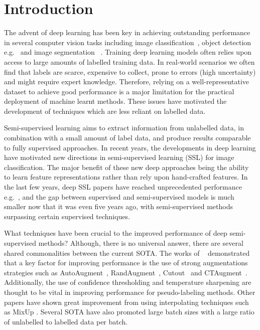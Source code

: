 \documentclass[journal]{IEEEtran}
\begin{document}
\section{Introduction}
The advent of deep learning has been key in achieving outstanding performance in several computer vision tasks including image classification~\cite{simonyan2014very,krizhevsky2012imagenet, he2016deep,hu2018squeeze,wang2017residual}, object detection e.g.~\cite{ren2015faster,girshick2015fast,redmon2016you} and image segmentation ~\cite{long2015fully, ronneberger2015u, chen2017deeplab}. Training deep learning models often relies upon access to large amounts of labelled training data. In real-world scenarios we often find that labels are scarce, expensive to collect, prone to errors (high uncertainty) and might require expert knowledge. Therefore, relying on a well-representative dataset to achieve good performance is a major limitation for the practical deployment of machine learnt methods.  These issues have motivated the development of techniques which are less reliant on labelled data.

Semi-supervised learning aims to extract information from unlabelled data, in combination with a small amount of label data, and produce results comparable to fully supervised approaches. In recent years, the developments in deep learning have motivated new directions in semi-supervised learning (SSL) for image classification. The major benefit of these new deep approaches being the ability to learn feature representations rather than rely upon hand-crafted features. In the last few years, deep SSL papers have reached unprecedented performance e.g.~\cite{sohn2020fixmatch,xie2019unsupervised}, and the gap between supervised and semi-supervised models is much smaller now that it was even five years ago, with semi-supervised methods surpassing certain supervised techniques.

What techniques have been crucial to the improved performance of deep semi-supervised methods? Although, there is no universal answer, there are several shared commonalities between the current SOTA.  The works of ~\cite{xie2019unsupervised,sohn2020fixmatch,remixmatch} demonstrated that a key factor for improving performance is the use of strong augmentations strategies such as AutoAugment~\cite{cubuk2018autoaugment}, RandAugment~\cite{cubuk2020randaugment}, Cutout~\cite{devries2017improved} and CTAugment~\cite{remixmatch}. Additionally, the use of confidence thresholding \cite{sohn2020fixmatch,simplepseudo} and temperature sharpening \cite{xie2019unsupervised,berthelot2019mixmatch} are thought to be vital in improving performance for pseudo-labeling methods. Other papers \cite{arazo2019pseudo,verma2019interpolation,berthelot2019mixmatch} have shown great improvement from using interpolating techniques such as MixUp \cite{zhang2017mixup}. Several SOTA have also promoted large batch sizes \cite{sohn2020fixmatch} with a large ratio of unlabelled to labelled data per batch.
\end{document}
